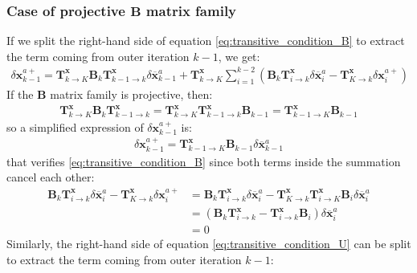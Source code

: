 \documentclass[12pt]{scrartcl}
\begin{document}
\subsubsection{Case of projective $\mathbf{B}$ matrix family}
If we split the right-hand side of equation \eqref{eq:transitive_condition_B} to extract the term coming from outer iteration $k-1$, we get:
\begin{align}
\delta \mathbf{x}^{a+}_{k-1} = \mathbf{T}^\mathbf{x}_{k \rightarrow K} \mathbf{B}_k \mathbf{T}^\mathbf{x}_{k-1 \rightarrow k} \delta \overline{\mathbf{x}}^a_{k-1} + \mathbf{T}^\mathbf{x}_{k \rightarrow K} \sum_{i=1}^{k-2} \left(\mathbf{B}_k \mathbf{T}^\mathbf{x}_{i \rightarrow k} \delta \overline{\mathbf{x}}^a_i - \mathbf{T}^\mathbf{x}_{K \rightarrow k} \delta \mathbf{x}^{a+}_i\right)
\end{align}
If the $\mathbf{B}$ matrix family is projective, then:
\begin{align}
\mathbf{T}^\mathbf{x}_{k \rightarrow K} \mathbf{B}_k \mathbf{T}^\mathbf{x}_{k-1 \rightarrow k} = \mathbf{T}^\mathbf{x}_{k \rightarrow K} \mathbf{T}^\mathbf{x}_{k-1 \rightarrow k} \mathbf{B}_{k-1} = \mathbf{T}^\mathbf{x}_{k-1 \rightarrow K} \mathbf{B}_{k-1}
\end{align}
so a simplified expression of $\delta \mathbf{x}^{a+}_{k-1}$ is:
\begin{align}
\label{eq:projective_condition_B}
\delta \mathbf{x}^{a+}_{k-1} = \mathbf{T}^\mathbf{x}_{k-1 \rightarrow K} \mathbf{B}_{k-1} \delta \overline{\mathbf{x}}^a_{k-1}
\end{align}
that verifies \eqref{eq:transitive_condition_B} since both terms inside the summation cancel each other:
\begin{align}
\mathbf{B}_k \mathbf{T}^\mathbf{x}_{i \rightarrow k} \delta \overline{\mathbf{x}}^a_i - \mathbf{T}^\mathbf{x}_{K \rightarrow k} \delta \mathbf{x}^{a+}_i & = \mathbf{B}_k \mathbf{T}^\mathbf{x}_{i \rightarrow k} \delta \overline{\mathbf{x}}^a_i - \mathbf{T}^\mathbf{x}_{K \rightarrow k}  \mathbf{T}^\mathbf{x}_{i \rightarrow K} \mathbf{B}_i \delta \overline{\mathbf{x}}^a_i \nonumber \\
& = \left(\mathbf{B}_k \mathbf{T}^\mathbf{x}_{i \rightarrow k} - \mathbf{T}^\mathbf{x}_{i \rightarrow k} \mathbf{B}_i \right) \delta \overline{\mathbf{x}}^a_i \nonumber \\
& = 0
\end{align}
Similarly, the right-hand side of equation \eqref{eq:transitive_condition_U} can be split to extract the term coming from outer iteration $k-1$:
\end{document}
